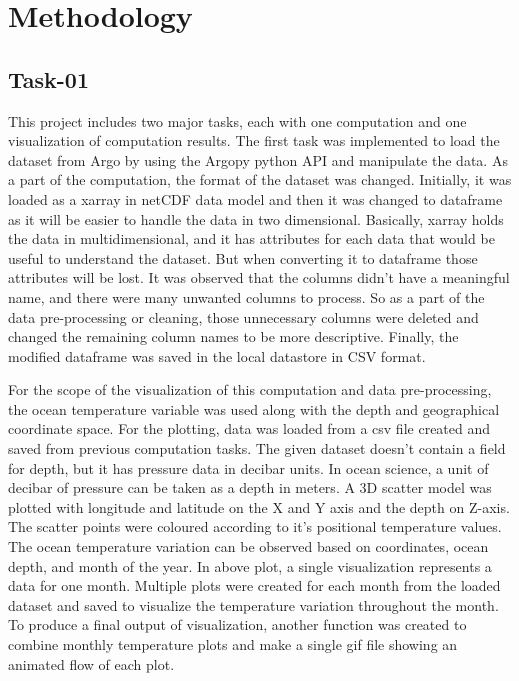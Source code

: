 \section{Methodology}
\subsection{Task-01}

This project includes two major tasks, each with one computation and one visualization of computation results. The first task was implemented to load the dataset from Argo by using the Argopy python API and manipulate the data. As a part of the computation, the format of the dataset was changed. Initially, it was loaded as a xarray in netCDF data model and then it was changed to dataframe as it will be easier to handle the data in two dimensional. Basically, xarray holds the data in multidimensional, and it has attributes for each data that would be useful to understand the dataset. But when converting it to dataframe those attributes will be lost. It was observed that the columns didn’t have a meaningful name, and there were many unwanted columns to process. So as a part of the data pre-processing or cleaning, those unnecessary columns were deleted and changed the remaining column names to be more descriptive. Finally, the modified dataframe was saved in the local datastore in CSV format. \newline 

\noindent For the scope of the visualization of this computation and data pre-processing, the ocean temperature variable was used along with the depth and geographical coordinate space. For the plotting, data was loaded from a csv file created and saved from previous computation tasks. The given dataset doesn’t contain a field for depth, but it has pressure data in decibar units. In ocean science, a unit of decibar of pressure can be taken as a depth in meters. A 3D scatter model was plotted with longitude and latitude on the X and Y axis and the depth on Z-axis. The scatter points were coloured according to it’s positional temperature values. The ocean temperature variation can be observed based on coordinates, ocean depth, and month of the year. In above plot, a single visualization represents a data for one month. Multiple plots were created for each month from the loaded dataset and saved to visualize the temperature variation throughout the month. To produce a final output of visualization, another function was created to combine monthly temperature plots and make a single gif file showing an animated flow of each plot.


